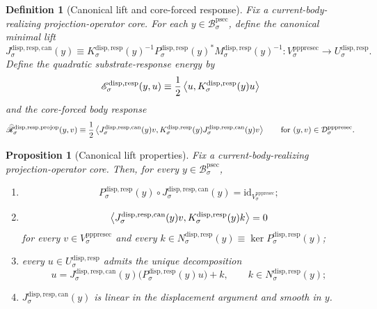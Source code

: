 \documentclass[11pt]{article}
\newcommand{\ProtoSectionBody}[1]{\mathcal B_{#1}^{\mathrm{psec}}}
\newcommand{\PrePreProtoSectionVertical}[1]{V_{#1}^{\mathrm{pppresec}}}
\newcommand{\PrePreProtoSectionResidualBody}[1]{\mathcal D_{#1}^{\mathrm{pppresec}}}
\newcommand{\SubstrateCarrier}[1]{U_{#1}^{\mathrm{disp,resp}}}
\newcommand{\SubstrateProjection}[1]{P_{#1}^{\mathrm{disp,resp}}}
\newcommand{\SubstrateOperator}[1]{K_{#1}^{\mathrm{disp,resp}}}
\newcommand{\SubstrateKernel}[1]{N_{#1}^{\mathrm{disp,resp}}}
\newcommand{\SubstrateEnergy}[1]{\mathscr E_{#1}^{\mathrm{disp,resp}}}
\newcommand{\CanonicalLift}[1]{J_{#1}^{\mathrm{disp,resp,can}}}
\newcommand{\SchurResponse}[1]{M_{#1}^{\mathrm{disp,resp}}}
\newcommand{\CoreForcedBodyResponse}[1]{\widehat{\mathscr R}_{#1}^{\mathrm{disp,resp,projop}}}
\newtheorem{definition}{Definition}
\newtheorem{proposition}{Proposition}
\begin{document}
\begin{definition}[Canonical lift and core-forced response]
\label{def:canonical}
Fix a current-body-realizing projection-operator core. For each \(y\in\ProtoSectionBody{\sigma}\), define the \emph{canonical minimal lift}
\begin{equation}
\CanonicalLift{\sigma}(y)
\equiv
\SubstrateOperator{\sigma}(y)^{-1}\SubstrateProjection{\sigma}(y)^*
\SchurResponse{\sigma}(y)^{-1}
:
\PrePreProtoSectionVertical{\sigma}\to\SubstrateCarrier{\sigma}.
\label{eq:canonical}
\end{equation}
Define the quadratic substrate-response energy by
\[
\SubstrateEnergy{\sigma}(y,u)
\equiv
\frac{1}{2}
\ev{u,\SubstrateOperator{\sigma}(y)u}
\]
and the \emph{core-forced body response}
\begin{equation}
\CoreForcedBodyResponse{\sigma}(y,v)
\equiv
\frac{1}{2}
\ev{
\CanonicalLift{\sigma}(y)v,
\SubstrateOperator{\sigma}(y)\CanonicalLift{\sigma}(y)v
}
\qquad
\text{for }
(y,v)\in\PrePreProtoSectionResidualBody{\sigma}.
\label{eq:coreresponse}
\end{equation}
\end{definition}

\begin{proposition}[Canonical lift properties]
\label{prop:canonical}
Fix a current-body-realizing projection-operator core. Then, for every \(y\in\ProtoSectionBody{\sigma}\),
\begin{enumerate}
    \item
    \[
    \SubstrateProjection{\sigma}(y)\circ\CanonicalLift{\sigma}(y)
    =
    \mathrm{id}_{\PrePreProtoSectionVertical{\sigma}};
    \]
    \item
    \[
    \ev{
    \CanonicalLift{\sigma}(y)v,
    \SubstrateOperator{\sigma}(y)k
    }
    =
    0
    \]
    for every \(v\in\PrePreProtoSectionVertical{\sigma}\) and every \(k\in\SubstrateKernel{\sigma}(y)\equiv\ker\SubstrateProjection{\sigma}(y)\);
    \item every \(u\in\SubstrateCarrier{\sigma}\) admits the unique decomposition
    \[
    u
    =
    \CanonicalLift{\sigma}(y)\bigl(\SubstrateProjection{\sigma}(y)u\bigr)
    +
    k,
    \qquad
    k\in\SubstrateKernel{\sigma}(y);
    \]
    \item \(\CanonicalLift{\sigma}(y)\) is linear in the displacement argument and smooth in \(y\).
\end{enumerate}
\end{proposition}
\end{document}
